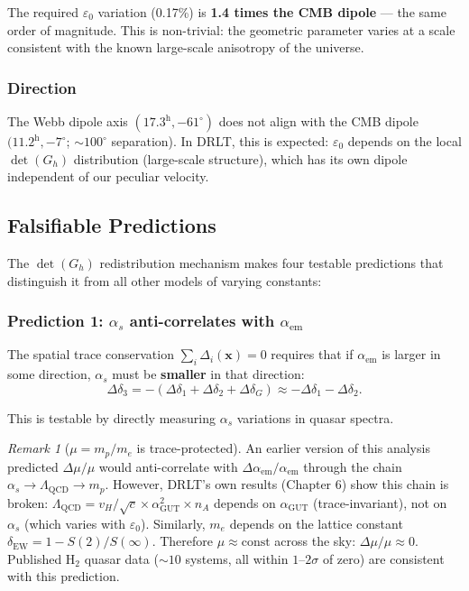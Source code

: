 \documentclass[12pt]{article}
\theoremstyle{remark}
\newtheorem{remark}[theorem]{Remark}
\theoremstyle{definition}
\newcommand{\agut}{\alpha_{\mathrm{GUT}}}
\begin{document}
The required $\varepsilon_0$ variation (0.17\%) is \textbf{1.4 times the CMB dipole} --- the same order of magnitude. This is non-trivial: the geometric parameter varies at a scale consistent with the known large-scale anisotropy of the universe.

\subsubsection{Direction}

The Webb dipole axis $(17.3^\text{h}, -61^\circ)$ does not align with the CMB dipole $(11.2^\text{h}, -7^\circ$; $\sim 100^\circ$ separation). In DRLT, this is expected: $\varepsilon_0$ depends on the local $\det(G_h)$ distribution (large-scale structure), which has its own dipole independent of our peculiar velocity.

\subsection{Falsifiable Predictions}

The $\det(G_h)$ redistribution mechanism makes four testable predictions that distinguish it from all other models of varying constants:

\subsubsection{Prediction 1: $\alpha_s$ anti-correlates with $\alpha_\text{em}$}

The spatial trace conservation $\sum_i \Delta_i(\mathbf{x}) = 0$ requires that if $\alpha_\text{em}$ is larger in some direction, $\alpha_s$ must be \textbf{smaller} in that direction:
\begin{equation}
\Delta\delta_3 = -(\Delta\delta_1 + \Delta\delta_2 + \Delta\delta_G) \approx -\Delta\delta_1 - \Delta\delta_2.
\end{equation}

This is testable by directly measuring $\alpha_s$ variations in quasar spectra.

\begin{remark}[$\mu = m_p/m_e$ is trace-protected]
An earlier version of this analysis predicted $\Delta\mu/\mu$ would anti-correlate with $\Delta\alpha_\text{em}/\alpha_\text{em}$ through the chain $\alpha_s \to \Lambda_\text{QCD} \to m_p$. However, DRLT's own results (Chapter 6) show this chain is broken: $\Lambda_\text{QCD} = v_H/\sqrt{c} \times \agut^2 \times n_A$ depends on $\agut$ (trace-invariant), not on $\alpha_s$ (which varies with $\varepsilon_0$). Similarly, $m_e$ depends on the lattice constant $\delta_\text{EW} = 1 - S(2)/S(\infty)$. Therefore $\mu \approx \text{const}$ across the sky: $\Delta\mu/\mu \approx 0$. Published H$_2$ quasar data ($\sim 10$ systems, all within $1$--$2\sigma$ of zero) are consistent with this prediction.
\end{remark}
\end{document}
